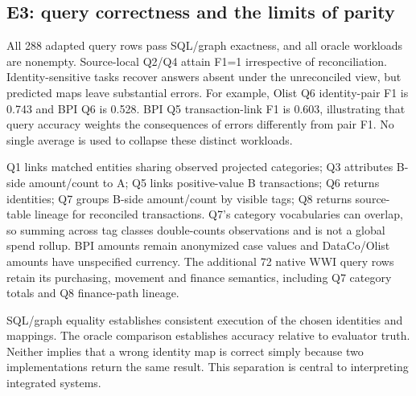 \documentclass[11pt,letterpaper]{article}
\begin{document}
\subsection{E3: query correctness and the limits of parity}
\begin{table}[t]\centering\small
\caption{Three-seed mean answer-set F1 for predicted identities on eight adapted templates. SQL and graph answers are exactly equal under unreconciled, predicted and oracle identities; oracle accuracy is one. Q2/Q4 are source-local controls.}\label{tab:queries}\end{table}
All 288 adapted query rows pass SQL/graph exactness, and all oracle workloads are nonempty. Source-local Q2/Q4 attain F1=1 irrespective of reconciliation. Identity-sensitive tasks recover answers absent under the unreconciled view, but predicted maps leave substantial errors. For example, Olist Q6 identity-pair F1 is 0.743 and BPI Q6 is 0.528. BPI Q5 transaction-link F1 is 0.603, illustrating that query accuracy weights the consequences of errors differently from pair F1. No single average is used to collapse these distinct workloads.

Q1 links matched entities sharing observed projected categories; Q3 attributes B-side amount/count to A; Q5 links positive-value B transactions; Q6 returns identities; Q7 groups B-side amount/count by visible tags; Q8 returns source-table lineage for reconciled transactions. Q7's category vocabularies can overlap, so summing across tag classes double-counts observations and is not a global spend rollup. BPI amounts remain anonymized case values and DataCo/Olist amounts have unspecified currency. The additional 72 native WWI query rows retain its purchasing, movement and finance semantics, including Q7 category totals and Q8 finance-path lineage.

SQL/graph equality establishes consistent execution of the chosen identities and mappings. The oracle comparison establishes accuracy relative to evaluator truth. Neither implies that a wrong identity map is correct simply because two implementations return the same result. This separation is central to interpreting integrated systems.
\end{document}
